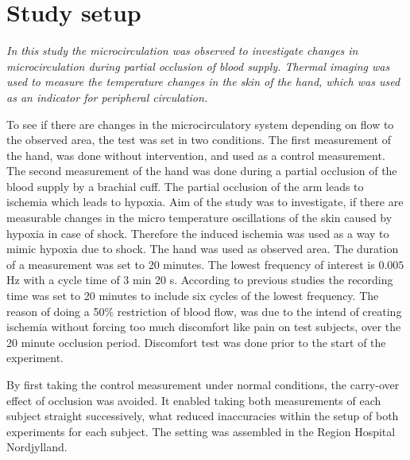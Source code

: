 \chapter{Study setup}

\textit{In this study the microcirculation was observed to investigate changes in microcirculation during partial occlusion of blood supply. Thermal imaging was used to measure the temperature changes in the skin of the hand, which was used as an indicator for peripheral circulation.} 


To see if there are changes in the microcirculatory system depending on flow to the observed area, the test was set in two conditions. The first measurement of the hand, was done without intervention, and used as a control measurement. The second measurement of the hand was done during a partial occlusion of the blood supply by a brachial cuff. The partial occlusion of the arm leads to ischemia which leads to hypoxia\cite{martini2012}. Aim of the study was to investigate, if there are measurable changes in the micro temperature oscillations of the skin caused by hypoxia in case of shock. Therefore the induced ischemia was used as a way to mimic hypoxia due to shock. The hand was used as observed area. 
The duration of a measurement was set to 20 minutes. The lowest frequency of interest is $0.005$ Hz with a cycle time of 3 min 20 s. According to previous studies the recording time was set to 20 minutes to include six cycles of the lowest frequency.\cite{sagaidachnyi2014}
The reason of doing a 50\% restriction of blood flow, was due to the intend of creating ischemia without forcing too much discomfort like pain on test subjects, over the 20 minute occlusion period. Discomfort test was done prior to the start of the experiment.

By first taking the control measurement under normal conditions, the carry-over effect of occlusion was avoided. It enabled taking both measurements of each subject straight successively, what reduced inaccuracies within the setup of both experiments for each subject. The setting was assembled in the Region Hospital Nordjylland.
